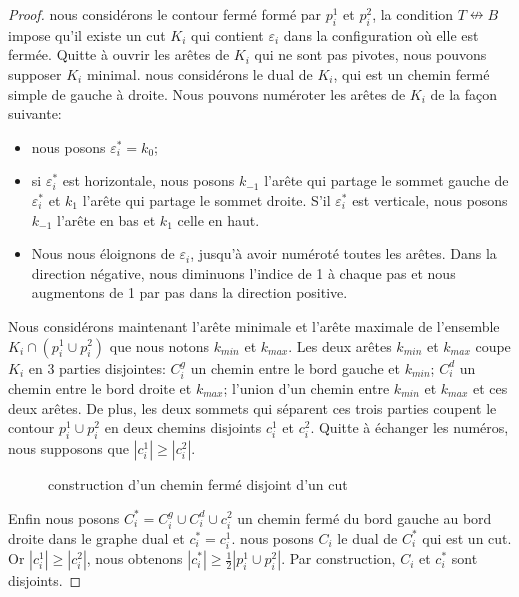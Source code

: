 \documentclass[titlepage,a4paper,12pt]{article}
\begin{document}
\begin{proof}
nous considérons le contour fermé formé par $p_i^1$ et $p_i^2$, la condition $T\nleftrightarrow B$ impose qu'il existe un cut $K_i$ qui contient $\varepsilon_i$ dans la configuration où elle est fermée. Quitte à ouvrir les arêtes de $K_i$ qui ne sont pas pivotes, nous pouvons supposer $K_i$ minimal. nous considérons le dual de $K_i$, qui est un chemin fermé simple de gauche à droite. Nous pouvons numéroter les arêtes de $K_i$ de la façon suivante:
\begin{itemize}
\item nous posons $\varepsilon^*_i = k_0$;
\item si $\varepsilon^*_i$ est horizontale, nous posons $k_{-1}$ l'arête qui partage le sommet gauche de $\varepsilon^*_i$ et $k_1$ l'arête qui partage le sommet droite. S'il $\varepsilon_i^*$ est verticale, nous posons $k_{-1}$ l'arête en bas et $k_1$ celle en haut.
\item Nous nous éloignons de $\varepsilon_i$, jusqu'à avoir numéroté toutes les arêtes. Dans la direction négative, nous diminuons l'indice de 1 à chaque pas et nous augmentons de 1 par pas dans la direction positive.
\end{itemize}

Nous considérons maintenant l'arête minimale et l'arête maximale de l'ensemble $K_i\cap (p_i^1\cup p_i^2)$ que nous notons $k_{min}$ et $k_{max}$. Les deux arêtes $k_{min}$ et $k_{max}$ coupe $K_i$ en 3 parties disjointes: $C^g_i$ un chemin entre le bord gauche et $k_{min}$; $C^d_i$ un chemin entre le bord droite et $k_{max}$; l'union d'un chemin entre $k_{min}$ et $k_{max}$ et ces deux arêtes. De plus, les deux sommets qui séparent ces trois parties coupent le contour $p_i^1\cup p_i^2$ en deux chemins disjoints $c_i^1$ et $c_i^2$. Quitte à échanger les numéros, nous supposons que $|c_i^1| \geqslant |c_i^2|$.
\begin{figure}[h]
\center
{}
\caption{construction d'un chemin fermé disjoint d'un cut}
\end{figure}

Enfin nous posons $C^*_i = C^g_i \cup C^d_i \cup c_i^2$ un chemin fermé du bord gauche au bord droite dans le graphe dual et $c_i^* = c_i^1$. nous posons $C_i$ le dual de $C^*_i$ qui est un cut. Or $|c_i^1| \geqslant |c_i^2|$, nous obtenons $|c^*_i| \geqslant \frac{1}{2}|p_i^1\cup p_i^2|$. Par construction, $C_i$ et $c_i^*$ sont disjoints.
\end{proof}
\end{document}
